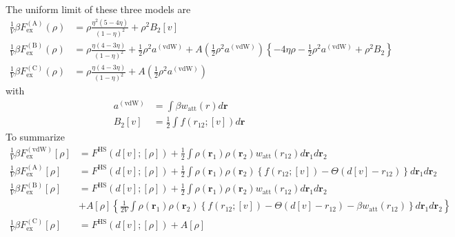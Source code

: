 \documentclass[aps,preprint]{revtex4-1}%
\begin{document}
The uniform limit of these three models are
\begin{align}
\frac{1}{V}\beta F_{\text{ex}}^{\left(  \text{A}\right)  }\left(  \rho\right)
& =\rho\frac{\eta^{2}\left(  5-4\eta\right)  }{\left(  1-\eta\right)  ^{2}%
}+\rho^{2}B_{2}\left[  v\right]  \\
\frac{1}{V}\beta F_{\text{ex}}^{\left(  \text{B}\right)  }\left(  \rho\right)
& =\rho\frac{\eta\left(  4-3\eta\right)  }{\left(  1-\eta\right)  ^{2}}%
+\frac{1}{2}\rho^{2}a^{\left(  \text{vdW}\right)  }+A\left(  \frac{1}{2}%
\rho^{2}a^{\left(  \text{vdW}\right)  }\right)  \left\{  -4\eta\rho-\frac
{1}{2}\rho^{2}a^{\left(  \text{vdW}\right)  }+\rho^{2}B_{2}\right\}
\nonumber\\
\frac{1}{V}\beta F_{\text{ex}}^{\left(  \text{C}\right)  }\left(  \rho\right)
& =\rho\frac{\eta\left(  4-3\eta\right)  }{\left(  1-\eta\right)  ^{2}%
}+A\left(  \frac{1}{2}\rho^{2}a^{\left(  \text{vdW}\right)  }\right)
\nonumber
\end{align}
with%
\begin{align}
a^{\left(  \text{vdW}\right)  }  & =\int\beta w_{\text{att}}\left(  r\right)
d\mathbf{r}\\
B_{2}\left[  v\right]    & =\frac{1}{2}\int f\left(  r_{12};\left[  v\right]
\right)  d\mathbf{r}\nonumber
\end{align}
To summarize%
\begin{align}
\frac{1}{V}\beta F_{\text{ex}}^{\left(  \text{vdW}\right)  }\left[
\rho\right]    & =F^{\text{HS}}\left(  d\left[  v\right]  ;\left[
\rho\right]  \right)  +\frac{1}{2}\int\rho\left(  \mathbf{r}_{1}\right)
\rho\left(  \mathbf{r}_{2}\right)  w_{\text{att}}\left(  r_{12}\right)
d\mathbf{r}_{1}d\mathbf{r}_{2}\\
\frac{1}{V}\beta F_{\text{ex}}^{\left(  \text{A}\right)  }\left[  \rho\right]
& =F^{\text{HS}}\left(  d\left[  v\right]  ;\left[  \rho\right]  \right)
+\frac{1}{2}\int\rho\left(  \mathbf{r}_{1}\right)  \rho\left(  \mathbf{r}%
_{2}\right)  \left\{  f\left(  r_{12};\left[  v\right]  \right)
-\Theta\left(  d\left[  v\right]  -r_{12}\right)  \right\}  d\mathbf{r}%
_{1}d\mathbf{r}_{2}\nonumber\\
\frac{1}{V}\beta F_{\text{ex}}^{\left(  \text{B}\right)  }\left[  \rho\right]
& =F^{\text{HS}}\left(  d\left[  v\right]  ;\left[  \rho\right]  \right)
+\frac{1}{2}\int\rho\left(  \mathbf{r}_{1}\right)  \rho\left(  \mathbf{r}%
_{2}\right)  w_{\text{att}}\left(  r_{12}\right)  d\mathbf{r}_{1}%
d\mathbf{r}_{2}\nonumber\\
& +A\left[  \rho\right]  \left\{  \frac{1}{2V}\int\rho\left(  \mathbf{r}%
_{1}\right)  \rho\left(  \mathbf{r}_{2}\right)  \left\{  f\left(
r_{12};\left[  v\right]  \right)  -\Theta\left(  d\left[  v\right]
-r_{12}\right)  -\beta w_{\text{att}}\left(  r_{12}\right)  \right\}
d\mathbf{r}_{1}d\mathbf{r}_{2}\right\}  \nonumber\\
\frac{1}{V}\beta F_{\text{ex}}^{\left(  \text{C}\right)  }\left[  \rho\right]
& =F^{\text{HS}}\left(  d\left[  v\right]  ;\left[  \rho\right]  \right)
+A\left[  \rho\right]  \nonumber
\end{align}
\end{document}
